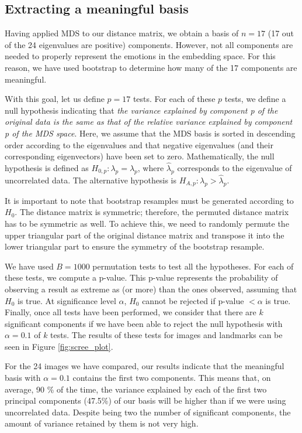 \documentclass[11pt, a4paper]{article}
\numberwithin{equation}{subsection}
\begin{document}
\subsection{Extracting a meaningful basis}

Having applied MDS to our distance matrix, we obtain a basis of $n = 17$ (17 out of the 24 eigenvalues are positive) components. However, not all components are needed to properly represent the emotions in the embedding space. For this reason, we have used bootstrap to determine how many of the 17 components are meaningful.

With this goal, let us define $p = 17$ tests. For each of these $p$ tests, we define a null hypothesis indicating that \textit{the variance explained by component p of the original data is the same as that of the relative variance explained by component p of the MDS space}. Here, we assume that the MDS basis is sorted in descending order according to the eigenvalues and that negative eigenvalues (and their corresponding eigenvectors) have been set to zero. Mathematically, the null hypothesis is defined as $H_{0, p}: \lambda_p = \hat{\lambda}_p$, where $\hat{\lambda}_p$ corresponds to the eigenvalue of uncorrelated data. The alternative hypothesis is $H_{A, p}: \lambda_p > \hat{\lambda}_p$.

It is important to note that bootstrap resamples must be generated according to $H_0$. The distance matrix is symmetric; therefore, the permuted distance matrix has to be symmetric as well. To achieve this, we need to randomly permute the upper triangular part of the original distance matrix and transpose it into the lower triangular part to ensure the symmetry of the bootstrap resample.

We have used $B = 1000$ permutation tests to test all the hypotheses. For each of these tests, we compute a p-value. This p-value represents the probability of observing a result as extreme as (or more) than the ones observed, assuming that $H_0$ is true. At significance level $\alpha$, $H_0$ cannot be rejected if p-value $< \alpha$ is true. Finally, once all tests have been performed, we consider that there are $k$ significant components if we have been able to reject the null hypothesis with $\alpha = 0.1$ of $k$ tests. The results of these tests for images and landmarks can be seen in Figure \ref{fig:scree_plot}.

For the 24 images we have compared, our results indicate that the meaningful basis with $\alpha = 0.1$ contains the first two components. This means that, on average, 90 \% of the time, the variance explained by each of the first two principal components (47.5\%) of our basis will be higher than if we were using uncorrelated data. Despite being two the number of significant components, the amount of variance retained by them is not very high.
\end{document}
